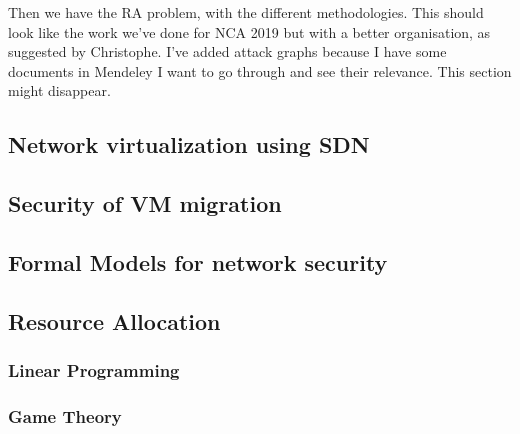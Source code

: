 \documentclass[a4paper, 11pt]{article}
\begin{document}
Then we have the RA problem, with the different methodologies. This should look like the work we've done for NCA 2019 but with a better organisation, as suggested by Christophe. I've added attack graphs because I have some documents in Mendeley I want to go through and see their relevance. This section might disappear.


\subsection{Network virtualization using SDN}











\subsection{Security of VM migration}




\subsection{Formal Models for network security}





\subsection{Resource Allocation}
\subsubsection{Linear Programming}
\cite{Stott1979,ofdma-awad2008,monitoring-nash1977,lpmedical-kwak1997,wirelessvirt-moubayed2015,transportation-wey2007,Ye2017a,book-LP,Papagianni2013}


\subsubsection{Game Theory}
\cite{MuraliKodialam2004,Huang2018,Chen2009,interdep-ismail2017,Kantzavelou2010,Nguyen2009,Zhu2009,Roy2010,Sallhammar2007,Kiennert2018}
\end{document}

